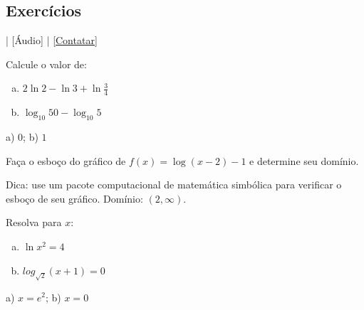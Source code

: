 \subsection*{Exercícios}

\begin{flushright}
  [Vídeo] | [Áudio] | \href{https://phkonzen.github.io/notas/contato.html}{[Contatar]}
\end{flushright}

\begin{exer}
  Calcule o valor de:
  \begin{enumerate}[a)]
  \item $2\ln 2 - \ln 3 + \ln \frac{3}{4}$
  \item $\log_{10} 50 - \log_{10} 5$
  \end{enumerate}
\end{exer}
\begin{resp}
  a) $0$; b) $1$
\end{resp}

\begin{exer}
  Faça o esboço do gráfico de $f(x) = \log(x-2)-1$ e determine seu domínio.
\end{exer}
\begin{resp}
  Dica: use um pacote computacional de matemática simbólica para verificar o esboço de seu gráfico. Domínio: $(2, \infty)$.
\end{resp}

\begin{exer}
  Resolva para $x$:
  \begin{enumerate}[a)]
  \item $\ln x^2 = 4$
  \item $log_{\sqrt{2}} (x+1) = 0$
  \end{enumerate}
\end{exer}
\begin{resp}
  a) $x=e^2$; b) $x=0$
\end{resp}

